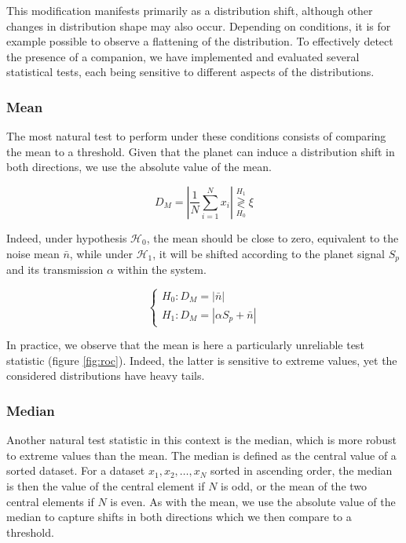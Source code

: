 \documentclass{article}
\begin{document}
This modification manifests primarily as a distribution shift, although other changes in distribution shape may also occur. Depending on conditions, it is for example possible to observe a flattening of the distribution. To effectively detect the presence of a companion, we have implemented and evaluated several statistical tests, each being sensitive to different aspects of the distributions.

\subsubsection{Mean}

The most natural test to perform under these conditions consists of comparing the mean to a threshold. Given that the planet can induce a distribution shift in both directions, we use the absolute value of the mean.

$$
D_{M} = \left|\frac{1}{N}\sum_{i=1}^N x_i \right| \stackrel{H_1}{\underset{H_0}{\gtrless}} \xi
$$

Indeed, under hypothesis $\mathcal{H}_0$, the mean should be close to zero, equivalent to the noise mean $\bar{n}$, while under $\mathcal{H}_1$, it will be shifted according to the planet signal $S_p$ and its transmission $\alpha$ within the system.

$$
\begin{cases}
H_0 : D_M = |\bar{n}|\\
H_1 : D_M =  |\alpha S_p + \bar{n}|
\end{cases}
$$

In practice, we observe that the mean is here a particularly unreliable test statistic (figure \ref{fig:roc}). Indeed, the latter is sensitive to extreme values, yet the considered distributions have heavy tails.

\subsubsection{Median}
Another natural test statistic in this context is the median, which is more robust to extreme values than the mean. The median is defined as the central value of a sorted dataset. For a dataset $x_1, x_2, \ldots, x_N$ sorted in ascending order, the median is then the value of the central element if $N$ is odd, or the mean of the two central elements if $N$ is even. As with the mean, we use the absolute value of the median to capture shifts in both directions which we then compare to a threshold.
\end{document}

